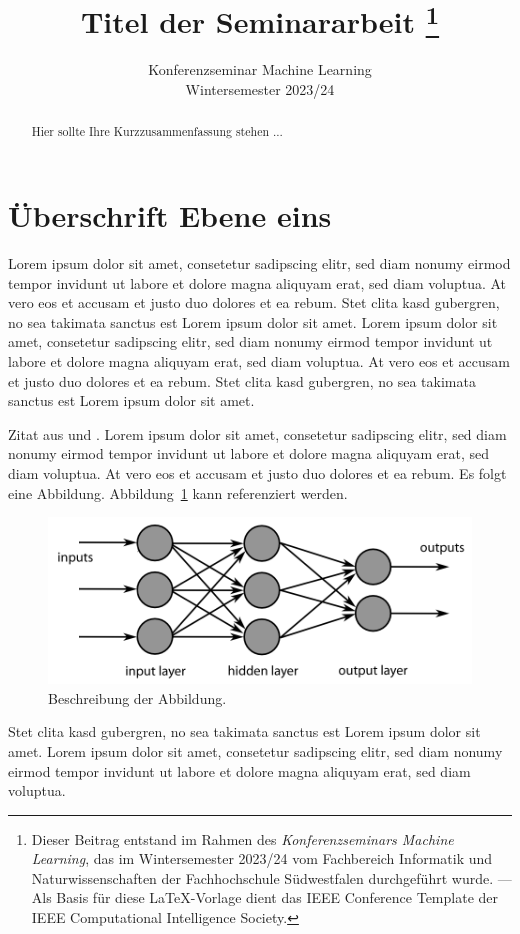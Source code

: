 \documentclass[a4paper, twoside]{IEEEtran}
\title{{{Titel der Seminararbeit}}
  \thanks{Dieser Beitrag entstand im Rahmen des \emph{Konferenzseminars Machine Learning}, das im Wintersemester 2023/24 vom Fachbereich Informatik und Naturwissenschaften der Fachhochschule Südwestfalen durchgeführt wurde. --- Als Basis für diese \LaTeX-Vorlage dient das IEEE Conference Template der IEEE Computational Intelligence Society.}}
\author{
  \IEEEauthorblockN{{{Ihr Name}}\\}
  \IEEEauthorblockA{Fachhochschule Südwestfalen}
  
  \vspace{3mm}
  Konferenzseminar Machine Learning\\
  Wintersemester 2023/24
}
\begin{document}
\maketitle

\begin{abstract}\null%
{{Hier sollte Ihre Kurzzusammenfassung stehen ... }}
\end{abstract}

\section{Überschrift Ebene eins}

Lorem ipsum dolor sit amet, consetetur sadipscing elitr, sed diam nonumy eirmod tempor invidunt ut labore et dolore magna aliquyam erat, sed diam voluptua. At vero eos et accusam et justo duo dolores et ea rebum. Stet clita kasd gubergren, no sea takimata sanctus est Lorem ipsum dolor sit amet. Lorem ipsum dolor sit amet, consetetur sadipscing elitr, sed diam nonumy eirmod tempor invidunt ut labore et dolore magna aliquyam erat, sed diam voluptua. At vero eos et accusam et justo duo dolores et ea rebum. Stet clita kasd gubergren, no sea takimata sanctus est Lorem ipsum dolor sit amet.

Zitat aus \cite{scheme} und \cite[17]{knuth}. Lorem ipsum dolor sit amet, consetetur sadipscing elitr, sed diam nonumy eirmod tempor invidunt ut labore et dolore magna aliquyam erat, sed diam voluptua. At vero eos et accusam et justo duo dolores et ea rebum.
Es folgt eine Abbildung. Abbildung~\ref{abbildung1} kann referenziert werden.

\begin{figure}[htbp]
\centering
\includegraphics[width=\columnwidth]{deeplearning}
\caption{Beschreibung der Abbildung.}
\label{abbildung1}
\end{figure}

Stet clita kasd gubergren, no sea takimata sanctus est Lorem ipsum dolor sit amet. Lorem ipsum dolor sit amet, consetetur sadipscing elitr, sed diam nonumy eirmod tempor invidunt ut labore et dolore magna aliquyam erat, sed diam voluptua.
\end{document}
